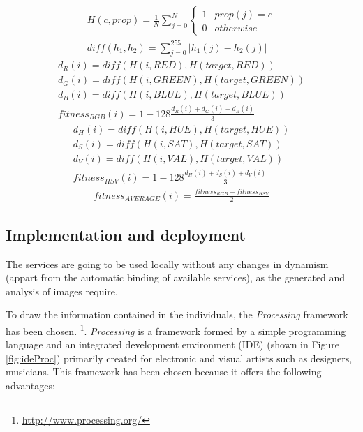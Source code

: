 \begin{eqnarray}
  \label{eq:histogram}
  H(c, prop) = \frac{1}{N}\sum_{j=0}^N \left\{\begin{matrix}
1 & prop(j) = c\\ 
0 & otherwise
\end{matrix}\right. \\
\label{eq:diff}
diff(h_1, h_2) = \sum_{j=0}^{255} |h_1(j) - h_2(j)|
\end{eqnarray}
\begin{eqnarray}
  d_R(i) = diff(H(i, RED), H(target, RED))\\
  d_G(i) = diff(H(i, GREEN), H(target, GREEN))\\
  d_B(i) =  diff(H(i, BLUE), H(target, BLUE))\\
  \label{eq:RGB}
  fitness_{RGB}(i) = 1 - 128\frac{d_R(i) + d_G(i) + d_B(i)}{3}
\end{eqnarray}
\begin{eqnarray}
  d_H(i) = diff(H(i, HUE), H(target, HUE))\\
  d_S(i) = diff(H(i, SAT), H(target, SAT))\\
  d_V(i) =  diff(H(i, VAL), H(target, VAL))\\
  \label{eq:HSV}
  fitness_{HSV}(i) = 1 - 128\frac{d_H(i) + d_S(i) + d_V(i)}{3}
\end{eqnarray}
\begin{eqnarray}
  \label{eq:AVERAGE}
  fitness_{AVERAGE}(i) = \frac{fitness_{RGB}+fitness_{HSV}}{2}
\end{eqnarray}




\subsection{Implementation and deployment}


The services are going to be used locally without any changes in dynamism (appart from the automatic binding of available services), as the generated and analysis of images require.

To draw the information contained in the individuals, the {\em Processing} framework has been chosen.
\footnote{\url{http://www.processing.org/}}.  %
 {\em Processing} \cite{PROCESSING} is a framework formed by a simple
 programming language and an integrated development environment (IDE)
 (shown in Figure \ref{fig:ideProc}) primarily created for electronic
 and visual artists such as designers, musicians. This framework has been chosen because it offers
 the following advantages: %

